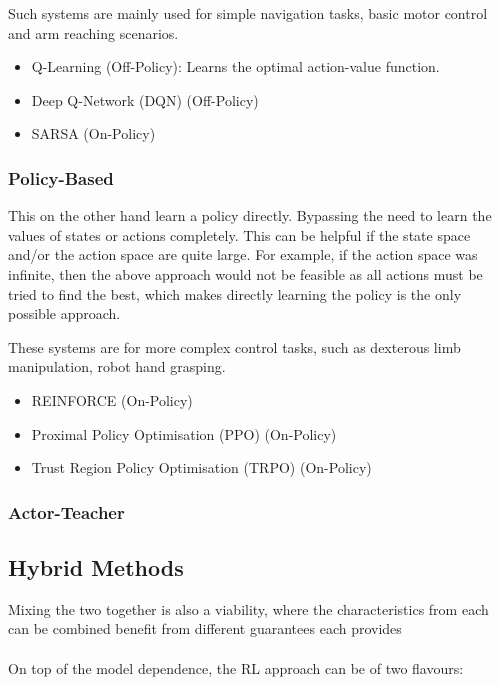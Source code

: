     Such systems are mainly used for simple navigation tasks, basic motor control and arm reaching scenarios.

    \begin{itemize}
      \item Q-Learning (Off-Policy): Learns the optimal action-value function.
      \item Deep Q-Network (DQN) (Off-Policy)
      \item SARSA (On-Policy)
    \end{itemize}

  \subsubsection{Policy-Based}
  This on the other hand learn a policy directly. Bypassing the need to learn the values of states or actions completely. This can be helpful if the state space and/or the action space are quite large. For example, if the action space was infinite, then the above approach would not be feasible as all actions must be tried to find the best, which makes directly learning the policy is the only possible approach.

  These systems are for more complex control tasks, such as dexterous limb manipulation, robot hand grasping.

    \begin{itemize}
      \item REINFORCE (On-Policy)
      \item Proximal Policy Optimisation (PPO) (On-Policy)
      \item Trust Region Policy Optimisation (TRPO) (On-Policy)
    \end{itemize}

  \subsubsection{Actor-Teacher} 
  
  \subsection{Hybrid Methods}
  Mixing the two together is also a viability, where the characteristics from each can be combined benefit from different guarantees each provides \cite{qu2020combiningmodelbasedmodelfreemethods}
\\\\
  On top of the model dependence, the RL approach can be of two flavours:

